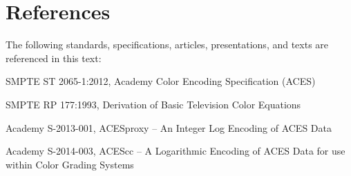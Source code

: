 \numberedformat
\chapter{References}
The following standards, specifications, articles, presentations, and texts are referenced in this text:

SMPTE ST 2065-1:2012, Academy Color Encoding Specification (ACES)

SMPTE RP 177:1993, Derivation of Basic Television Color Equations

Academy S-2013-001, ACESproxy -- An Integer Log Encoding of ACES Data

Academy S-2014-003, ACEScc -- A Logarithmic Encoding of ACES Data for use within Color Grading Systems